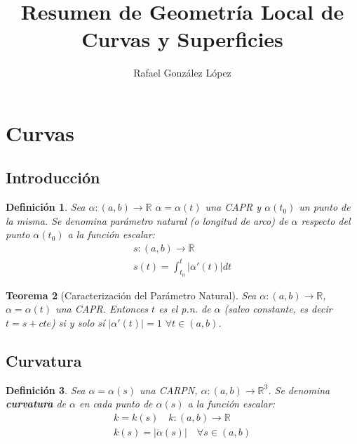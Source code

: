 \documentclass[twoside]{article}
\newtheorem{theorem}{Teorema}[section]
\newtheorem{defi}[theorem]{Definición}
\numberwithin{equation}{section}
\providecommand{\abs}[1]{\lvert#1\rvert}
\newcommand{\erre}{\mathbb{R}}
\begin{document}
\title{Resumen de Geometría Local de Curvas y Superficies }
\author{Rafael González López}
\maketitle
\section{Curvas}
\subsection{Introducción}
\begin{defi}
Sea $\alpha:(a,b)\longrightarrow \erre$ $\alpha=\alpha(t)$ una CAPR y $\alpha(t_0)$ un punto de la misma. Se denomina parámetro natural (o longitud de arco) de $\alpha$ respecto del punto $\alpha(t_0)$ a la función escalar:
\begin{gather*}
s:(a,b)\longrightarrow \erre\\
s(t)=\int_{t_0}^t \abs{\alpha'(t)}dt
\end{gather*}
\end{defi}
\begin{theorem}[Caracterización del Parámetro Natural] Sea $\alpha:(a,b)\longrightarrow \erre$, $\alpha=\alpha(t)$ una CAPR. Entonces $t$ es el p.n. de $\alpha$ (salvo constante, es decir $t=s+cte$) si y solo sí $\abs{\alpha'(t)}=1$ $\forall t\in(a,b)$.
\end{theorem}
\subsection{Curvatura}
\begin{defi}
Sea $\alpha=\alpha(s)$ una CARPN, $\alpha:(a,b)\longrightarrow \erre^3$. Se denomina \textbf{curvatura} de $\alpha$ en cada punto de $\alpha(s)$ a la función escalar:
\begin{gather*}
k=k(s) \quad k:(a,b)\longrightarrow \erre\\
k(s)=\abs{\ddot{\alpha}(s)} \quad \forall s\in (a,b)
\end{gather*}
\end{defi}
\newpage
\end{document}
